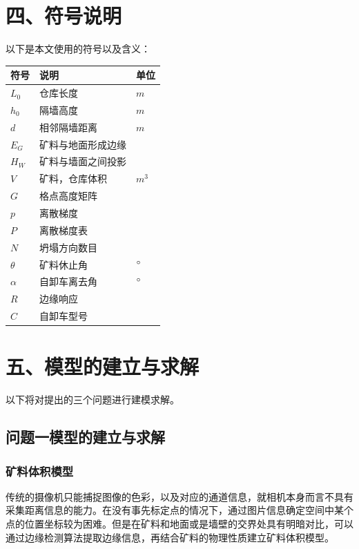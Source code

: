 \documentclass{my_paper}
\begin{document}
\section{四、符号说明}
以下是本文使用的符号以及含义：
\begin{table}[h]%
    \centering
    \begin{tabular}{p{2.0cm}<{\centering}p{9.0cm}<{\centering}p{2.0cm}<{\centering}}
    \hline
    符号 & 说明 & 单位 \\ %
    \hline
    $L_0$ & 仓库长度 &  $m$\\
    $h_0$ & 隔墙高度 &  $m$ \\
    $d$ & 相邻隔墙距离 &  $m$ \\
    $E_G$ & 矿料与地面形成边缘 &  \\
    $H_W$ & 矿料与墙面之间投影 &  \\
    $V$ & 矿料，仓库体积 &  $m^3$ \\
    $G$ & 格点高度矩阵 &  \\
    $p$ & 离散梯度 &  \\
    $P$ & 离散梯度表 &  \\
    $N$ & 坍塌方向数目 &  \\
    $\theta$ & 矿料休止角 &$\degree$\\
    $\alpha$ & 自卸车离去角 &$\degree$  \\
    $R$ & 边缘响应 &  \\
    $C$ & 自卸车型号 &  \\
    \hline
    \end{tabular}
\end{table}

\section{五、模型的建立与求解}

以下将对提出的三个问题进行建模求解。
\subsection{问题一模型的建立与求解}


\subsubsection{矿料体积模型}
    传统的摄像机只能捕捉图像的色彩，以及对应的通道信息，就相机本身而言不具有采集距离信息的能力。在没有事先标定点的情况下，通过图片信息确定空间中某个点的位置坐标较为困难。但是在矿料和地面或是墙壁的交界处具有明暗对比，可以通过边缘检测算法提取边缘信息，再结合矿料的物理性质建立矿料体积模型。
\end{document}
